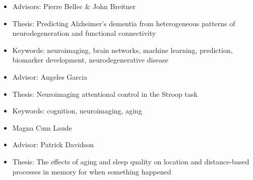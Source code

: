 \documentclass[10pt,a4paper,ragged2e,withhyper]{altacv}
\begin{document}
\begin{paracol}{2}


\switchcolumn


\begin{itemize}
    \item Advisors: Pierre Bellec \& John Breitner
    \item Thesis: Predicting Alzheimer's dementia from heterogeneous patterns of neurodegeneration and functional connectivity
    \item Keywords: neuroimaging, brain networks, machine learning, prediction, biomarker development, neurodegenerative disease
\end{itemize}

\divider

\begin{itemize}
    \item Advisor: Angeles Garcia
    \item Thesis: Neuroimaging attentional control in the Stroop task
    \item Keywords: cognition, neuroimaging, aging
\end{itemize}

\divider

\begin{itemize}
    \item Magna Cum Laude
    \item Advisor: Patrick Davidson
    \item Thesis: The effects of aging and sleep quality on location and distance-based processes in memory for when something happened
\end{itemize}


 \\
 \\
\divider\smallskip


\end{paracol}
\end{document}
